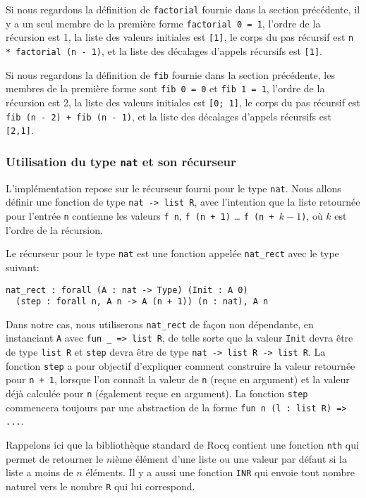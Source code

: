\documentclass{jflart}
\begin{document}
Si nous regardons la définition de \texttt{factorial} fournie dans la
section précédente, il y a un seul membre de la première forme
\texttt{factorial 0 = 1}, l'ordre de la récursion est 1,
la liste des valeurs initiales est \texttt{[1]}, le
corps du pas récursif est \texttt{n * factorial (n - 1)}, et la liste
des décalages d'appels récursifs est \texttt{[1]}.

Si nous regardons la définition de \texttt{fib} fournie dans la section
précédente, les membres de la première forme sont \texttt{fib 0 = 0} et
\texttt{fib 1 = 1}, l'ordre de la récursion est 2,
la liste des valeurs initiales est \texttt{[0; 1]},
le corps du pas récursif est \texttt{fib (n - 2) + fib (n - 1)}, et
la liste des décalages d'appels récursifs est \texttt{[2,1]}.

\subsubsection{Utilisation du type \texttt{nat} et son récurseur}
L'implémentation repose sur le récurseur fourni pour le type
\texttt{nat}.  Nous allons définir une fonction de type \texttt{nat -> list
  R}, avec l'intention que la liste retournée pour l'entrée \texttt{n}
contienne les valeurs \texttt{f n}, \texttt{f (n + 1)} \dots
\texttt{f (n + \(k - 1\))}, où \(k\) est l'ordre de la récursion.

Le récurseur pour le type \texttt{nat} est une fonction appelée
\texttt{nat\_rect} avec le type suivant:
\begin{verbatim}
nat_rect : forall (A : nat -> Type) (Init : A 0)
  (step : forall n, A n -> A (n + 1)) (n : nat), A n
\end{verbatim}
Dans notre cas, nous utiliserons \texttt{nat\_rect} de façon non
dépendante, en instanciant \texttt{A} avec \texttt{fun \_ => list R},
de telle sorte que la
valeur \texttt{Init} devra être de type \texttt{list R} et \texttt{step} devra
être de type \texttt{nat -> list R -> list R}.  La fonction \texttt{step} a
pour objectif d'expliquer comment construire la valeur retournée pour
\texttt{n + 1}, lorsque l'on connaît la valeur de \texttt{n} (reçue en argument)
et la valeur déjà calculée pour \texttt{n} (également reçue en
argument).
La fonction \texttt{step} commencera
toujours par une abstraction de la forme \texttt{fun n (l : list R) => ...}.

Rappelons ici que la bibliothèque standard de Rocq contient une
fonction \texttt{nth} qui permet de retourner le \(n\)ième élément d'une
liste ou une valeur par défaut si la liste a moins de \(n\) éléments.  Il
y a aussi une fonction \texttt{INR} qui envoie tout nombre naturel vers
le nombre \texttt{R} qui lui correspond.
\end{document}
